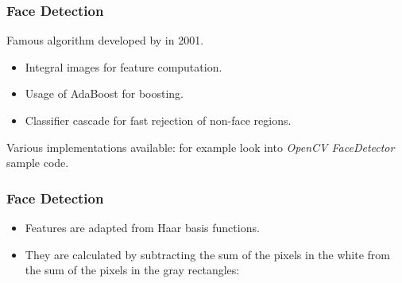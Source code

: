 


\begin{frame}
  \frametitle{Face Detection}

  Famous algorithm developed by  in 2001.
  \spread


  \begin{itemize}
    \item Integral images for feature computation.
    \item Usage of AdaBoost for boosting.
    \item Classifier cascade for fast rejection of non-face regions.
  \end{itemize}
  \spread

  Various implementations available: for example look into \textit{OpenCV FaceDetector} sample code.
\end{frame}


\begin{frame}
  \frametitle{Face Detection \cont}


  \begin{itemize}
    \item Features are adapted from Haar basis functions. %
    \item They are calculated by subtracting the sum of the pixels in the white from the sum of the pixels in the gray rectangles: \\[.3cm] %
  \end{itemize}


  \begin{center}
    \resizebox{.4\linewidth}{!}{
      
    }
  \end{center}
\end{frame}


